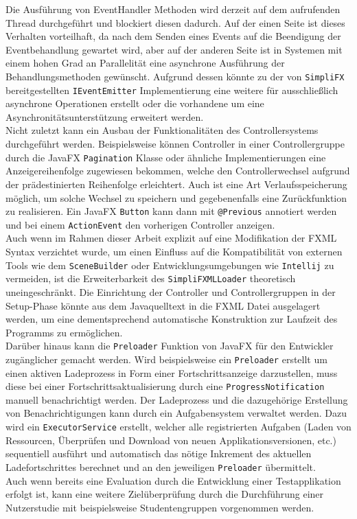Die Ausführung von EventHandler Methoden wird derzeit auf dem aufrufenden Thread durchgeführt und blockiert diesen dadurch. Auf der einen Seite ist dieses Verhalten vorteilhaft, da nach dem Senden eines Events auf die Beendigung der Eventbehandlung gewartet wird, aber auf der anderen Seite ist in Systemen mit einem hohen Grad an Parallelität eine asynchrone Ausführung der Behandlungsmethoden gewünscht. Aufgrund dessen könnte zu der von \texttt{SimpliFX} bereitgestellten \texttt{IEventEmitter} Implementierung eine weitere für ausschließlich asynchrone Operationen erstellt oder die vorhandene um eine Asynchronitätsunterstützung erweitert werden.\\
Nicht zuletzt kann ein Ausbau der Funktionalitäten des Controllersystems durchgeführt werden. Beispielsweise können Controller in einer Controllergruppe durch die JavaFX \texttt{Pagination} Klasse oder ähnliche Implementierungen eine Anzeigereihenfolge zugewiesen bekommen, welche den Controllerwechsel aufgrund der prädestinierten Reihenfolge erleichtert. Auch ist eine Art Verlaufsspeicherung möglich, um solche Wechsel zu speichern und gegebenenfalls eine Zurückfunktion zu realisieren. Ein JavaFX \texttt{Button} kann dann mit \texttt{@Previous} annotiert werden und bei einem \texttt{ActionEvent} den vorherigen Controller anzeigen.\\
Auch wenn im Rahmen dieser Arbeit explizit auf eine Modifikation der FXML Syntax verzichtet wurde, um einen Einfluss auf die Kompatibilität von externen Tools wie dem \texttt{SceneBuilder} oder Entwicklungsumgebungen wie \texttt{Intellij} zu vermeiden, ist die Erweiterbarkeit des \texttt{SimpliFXMLLoader} theoretisch uneingeschränkt. Die Einrichtung der Controller und Controllergruppen in der Setup-Phase könnte aus dem Javaquelltext in die FXML Datei ausgelagert werden, um eine dementsprechend automatische Konstruktion zur Laufzeit des Programms zu ermöglichen.\\
Darüber hinaus kann die \texttt{Preloader} Funktion von JavaFX für den Entwickler zugänglicher gemacht werden. Wird beispielsweise ein \texttt{Preloader} erstellt um einen aktiven Ladeprozess in Form einer Fortschrittsanzeige darzustellen, muss diese bei einer Fortschrittsaktualisierung durch eine \texttt{ProgressNotification} manuell benachrichtigt werden. Der Ladeprozess und die dazugehörige Erstellung von Benachrichtigungen kann durch ein Aufgabensystem verwaltet werden. Dazu wird ein \texttt{ExecutorService} erstellt, welcher alle registrierten Aufgaben (Laden von Ressourcen, Überprüfen und Download von neuen Applikationsversionen, etc.) sequentiell ausführt und automatisch das nötige Inkrement des aktuellen Ladefortschrittes berechnet und an den jeweiligen \texttt{Preloader} übermittelt.\\
Auch wenn bereits eine Evaluation durch die Entwicklung einer Testapplikation erfolgt ist, kann eine weitere Zielüberprüfung durch die Durchführung einer Nutzerstudie mit beispielsweise Studentengruppen vorgenommen werden.
